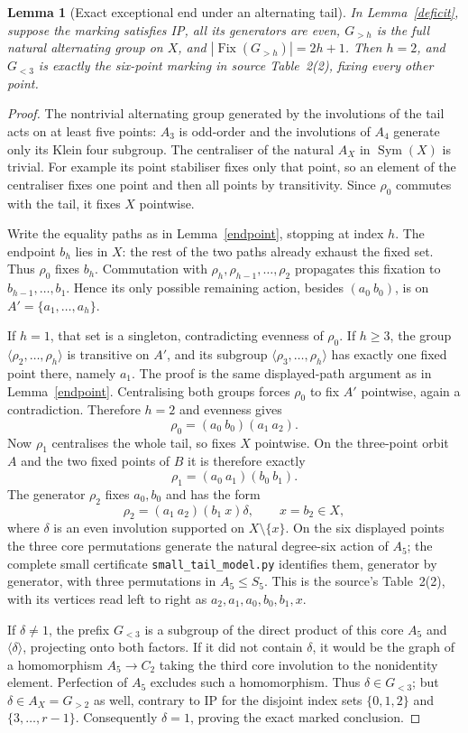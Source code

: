 \documentclass[11pt,a4paper]{article}
\newtheorem{lemma}{Lemma}
\newcommand{\gen}[1]{\langle#1\rangle}
\begin{document}
\begin{lemma}[Exact exceptional end under an alternating tail]
\label{alternatingtail}
In Lemma~\ref{deficit}, suppose the marking satisfies IP, all
its generators are even, $G_{>h}$ is the full natural alternating
group on $X$, and $|\operatorname{Fix}(G_{>h})|=2h+1$.
Then $h=2$, and $G_{<3}$ is exactly the six-point marking in
source Table~2(2), fixing every other point.
\end{lemma}
\begin{proof}
The nontrivial alternating group generated by the involutions of
the tail acts on at least five points: $A_3$ is odd-order and the
involutions of $A_4$ generate only its Klein four subgroup.
The centraliser of the natural $A_X$ in $\operatorname{Sym}(X)$
is trivial. For example its point stabiliser fixes only that point,
so an element of the centraliser fixes one point and then all points
by transitivity. Since $\rho_0$ commutes with the tail, it fixes $X$
pointwise.

Write the equality paths as in Lemma~\ref{endpoint}, stopping at
index $h$. The endpoint $b_h$ lies in $X$: the rest of the two paths
already exhaust the fixed set. Thus $\rho_0$ fixes $b_h$.
Commutation with $\rho_h,\rho_{h-1},\ldots,\rho_2$ propagates
this fixation to $b_{h-1},\ldots,b_1$. Hence its only possible
remaining action, besides $(a_0\ b_0)$, is on
$A'=\{a_1,\ldots,a_h\}$.

If $h=1$, that set is a singleton, contradicting evenness of
$\rho_0$. If $h\ge3$, the group
$\gen{\rho_2,\ldots,\rho_h}$ is transitive on $A'$, and its
subgroup $\gen{\rho_3,\ldots,\rho_h}$ has exactly one fixed
point there, namely $a_1$. The proof is the same displayed-path
argument as in Lemma~\ref{endpoint}. Centralising both groups
forces $\rho_0$ to fix $A'$ pointwise, again a contradiction.
Therefore $h=2$ and evenness gives
\[
 \rho_0=(a_0\ b_0)(a_1\ a_2).
\]
Now $\rho_1$ centralises the whole tail, so fixes $X$ pointwise.
On the three-point orbit $A$ and the two fixed points of $B$ it is
therefore exactly
\[
 \rho_1=(a_0\ a_1)(b_0\ b_1).
\]
The generator $\rho_2$ fixes $a_0,b_0$ and has the form
\[
 \rho_2=(a_1\ a_2)(b_1\ x)\delta,\qquad x=b_2\in X,
\]
where $\delta$ is an even involution supported on
$X\setminus\{x\}$. On the six displayed points the three core
permutations generate the natural degree-six action of $A_5$;
the complete small certificate \texttt{small\_tail\_model.py}
identifies them, generator by generator, with three permutations
in $A_5\le S_5$. This is the source's Table~2(2), with its vertices
read left to right as $a_2,a_1,a_0,b_0,b_1,x$.

If $\delta\ne1$, the prefix $G_{<3}$ is a subgroup of the direct
product of this core $A_5$ and $\gen{\delta}$, projecting onto
both factors. If it did not contain $\delta$, it would be the
graph of a homomorphism $A_5\to C_2$ taking the third core
involution to the nonidentity element. Perfection of $A_5$
excludes such a homomorphism. Thus $\delta\in G_{<3}$; but
$\delta\in A_X=G_{>2}$ as well, contrary to IP for the disjoint
index sets $\{0,1,2\}$ and $\{3,\ldots,r-1\}$. Consequently
$\delta=1$, proving the exact marked conclusion.
\end{proof}
\end{document}
